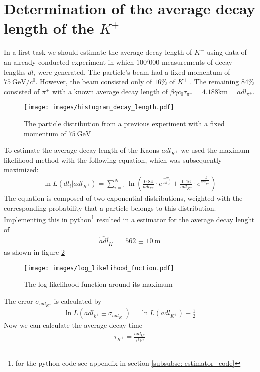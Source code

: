 \documentclass[12pt,a4paper,oneside,english]{article}
\begin{document}
\section{Determination of the average decay length of the $K^+$}
In a first task we should estimate the average decay length of $K^+$ using data of an already conducted experiment in which $100'000$ measurements
of decay lengths $dl_i$ were generated. The particle's beam had a fixed momentum of $\SI{75}{\giga\electronvolt\per\clight}$. However, the beam consisted only of $16\%$ of
$K^+$ . The remaining $84\%$ consisted of $\pi^+$ with a known average decay length of $\beta \gamma c_0 \tau_{\pi^+} = 4.188 \si{\kilo\meter} =
adl_{\pi^+}$.
\begin{figure}[H]
\centering
\texttt{[image: images/histogram\_decay\_length.pdf]}
	\caption{The particle distribution from a previous experiment with a fixed momentum of $\SI{75}{\giga\electronvolt}$}
	\label{fig:decay}
\end{figure}
To estimate the average decay length of the Kaons $adl_{K^+}$ we used the maximum likelihood method with
the following equation, which was subsequently maximized:
\begin{align}
\ln L(dl_i|adl_{K^+}) = \sum_{i=1}^{N}\ln\left(\frac{0.84}{adl_{\pi^+}}\cdot e^{\frac{-dl_i}{adl_{\pi^+}}}+\frac{0.16}{adl_{K^+}}\cdot e^{\frac{-dl_i}{adl_{K^+}}}\right)
\end{align}
The equation is composed of two exponential distributions, weighted with the corresponding probability that a particle belongs to this distribution. Implementing this in python\footnote{for the python code see appendix in section \ref{subsubse: estimator_code} } resulted in a estimator for the average decay lenght of
\begin{align}
\widehat{adl}_{K^+} = \SI{562(10)}{\meter}
\end{align}
as shown in figure \ref{fig:log_likelihood}
\begin{figure}[H]
\centering
\texttt{[image: images/log\_likelihood\_fuction.pdf]}
	\caption{The log-likelihood function around its maximum}
	\label{fig:log_likelihood}
\end{figure}
The error $\sigma_{adl_{K^+}}$ is calculated by
\begin{align}
\ln L(adl_{k^+}\pm\sigma_{adl_{K^+}}) = \ln L(adl_{K^+}) - \frac{1}{2}
\end{align}
Now we can calculate the average decay time
\begin{align}
\tau_{K^+} = \frac{adl_{k^+}}{\beta\gamma c}
\end{align}
\end{document}
